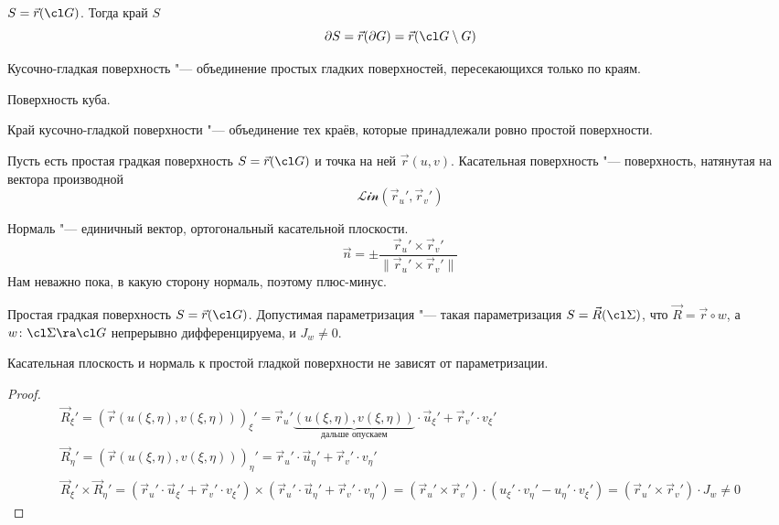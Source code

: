 \begin{Def}
	$S = \vec r(\cl G)$. Тогда край $S$
	\[ \partial S = \vec r(\partial G) = \vec r(\cl G \setminus G) \]
\end{Def}

\begin{Def}
	Кусочно-гладкая поверхность "--- объединение простых гладких поверхностей, пересекающихся только по краям.
\end{Def}

\begin{exmp}
	Поверхность куба.
\end{exmp}

\begin{Def}
	Край кусочно-гладкой поверхности "--- объединение тех краёв, которые принадлежали ровно простой поверхности.
\end{Def}

\begin{Def}
	Пусть есть простая градкая поверхность $S = \vec r(\cl G)$ и точка на ней $\vec r(u, v)$.
	Касательная поверхность "--- поверхность, натянутая на вектора производной
	\[ \mathcal{Lin}(\vec r_u', \vec r_v') \]
\end{Def}

\begin{Def}
	Нормаль "--- единичный вектор, ортогональный касательной плоскости.
	\[ \vec n = \pm\frac{\vec r_u' \times \vec r_v'}{\|\vec r_u' \times \vec r_v'\|} \]
	Нам неважно пока, в какую сторону нормаль, поэтому плюс-минус.
\end{Def}

\begin{Def}
	Простая градкая поверхность $S = \vec r(\cl G)$.
	Допустимая параметризация "--- такая параметризация $S = \vec R(\cl \Sigma)$,
	что $\vec R = \vec r \circ w$, а $w\colon \cl \Sigma \ra \cl G$ непрерывно дифференцируема, и $J_w \ne 0$.
\end{Def}

\begin{theorem}\label{tangent_norm_param_eq}
	Касательная плоскость и нормаль к простой гладкой поверхности не зависят от параметризации.
\end{theorem}
\begin{proof}
	\begin{gather*}
		\vec R_\xi'
		= (\vec r(u(\xi,\eta),v(\xi,\eta)))_\xi'
		= \vec r_u'\underbrace{(u(\xi, \eta), v(\xi, \eta))}_{\text{дальше опускаем}} \cdot \vec u_\xi'  + \vec r_v' \cdot v_\xi'  \\
		\vec R_\eta'
		= (\vec r(u(\xi,\eta),v(\xi,\eta)))_\eta'
		= \vec r_u' \cdot \vec u_\eta' + \vec r_v' \cdot v_\eta' \\
		\vec R_\xi' \times \vec R_\eta'
		= (\vec r_u' \cdot \vec u_\xi'  + \vec r_v' \cdot v_\xi' ) \times (\vec r_u' \cdot \vec u_\eta' + \vec r_v' \cdot v_\eta')
		= (\vec r_u' \times \vec r_v') \cdot (u_\xi' \cdot v_\eta' - u_\eta' \cdot v_\xi')
		= (\vec r_u' \times \vec r_v') \cdot J_w \ne 0
	\end{gather*}
\end{proof}

